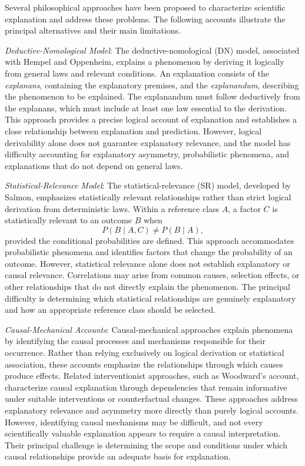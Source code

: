 Several philosophical approaches have been proposed to characterize scientific explanation and address these problems. The following accounts illustrate the principal alternatives and their main limitations.

\emph{Deductive-Nomological Model}: The deductive-nomological (DN) model, associated with Hempel and Oppenheim, explains a phenomenon by deriving it logically from general laws and relevant conditions. An explanation consists of the \emph{explanans}, containing the explanatory premises, and the \emph{explanandum}, describing the phenomenon to be explained. The explanandum must follow deductively from the explanans, which must include at least one law essential to the derivation. This approach provides a precise logical account of explanation and establishes a close relationship between explanation and prediction. However, logical derivability alone does not guarantee explanatory relevance, and the model has difficulty accounting for explanatory asymmetry, probabilistic phenomena, and explanations that do not depend on general laws.

\emph{Statistical-Relevance Model}: The statistical-relevance (SR) model, developed by Salmon, emphasizes statistically relevant relationships rather than strict logical derivation from deterministic laws. Within a reference class $A$, a factor $C$ is statistically relevant to an outcome $B$ when
\[
P(B \mid A,C) \neq P(B \mid A),
\]
provided the conditional probabilities are defined. This approach accommodates probabilistic phenomena and identifies factors that change the probability of an outcome. However, statistical relevance alone does not establish explanatory or causal relevance. Correlations may arise from common causes, selection effects, or other relationships that do not directly explain the phenomenon. The principal difficulty is determining which statistical relationships are genuinely explanatory and how an appropriate reference class should be selected.

\emph{Causal-Mechanical Accounts}: Causal-mechanical approaches explain phenomena by identifying the causal processes and mechanisms responsible for their occurrence. Rather than relying exclusively on logical derivation or statistical association, these accounts emphasize the relationships through which causes produce effects. Related interventionist approaches, such as Woodward's account, characterize causal explanation through dependencies that remain informative under suitable interventions or counterfactual changes. These approaches address explanatory relevance and asymmetry more directly than purely logical accounts. However, identifying causal mechanisms may be difficult, and not every scientifically valuable explanation appears to require a causal interpretation. Their principal challenge is determining the scope and conditions under which causal relationships provide an adequate basis for explanation.

